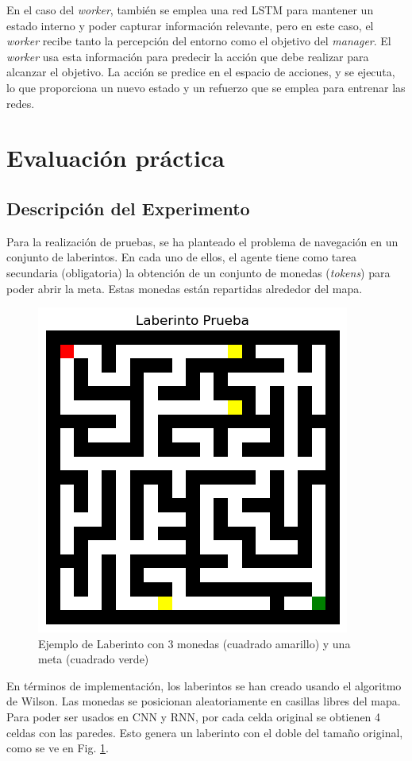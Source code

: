 \documentclass[letterpaper]{article} %
\begin{document}
En el caso del \textit{worker}, también se emplea una red LSTM para mantener un estado interno y poder capturar información relevante,
pero en este caso, el \textit{worker} recibe tanto la percepción del entorno como el objetivo del \textit{manager}. El \textit{worker} usa esta información
para predecir la acción que debe realizar para alcanzar el objetivo. La acción se predice en el espacio de acciones, y se ejecuta,
lo que proporciona un nuevo estado y un refuerzo que se emplea para entrenar las redes.

\section{Evaluación práctica}
\subsection{Descripción del Experimento}

Para la realización de pruebas, se ha planteado el problema de navegación en un conjunto de laberintos. 
En cada uno de ellos, el agente tiene como tarea secundaria (obligatoria) la obtención de un conjunto de 
monedas (\textit{tokens}) para poder abrir la meta. Estas monedas están repartidas alrededor del mapa.

\begin{figure}[H]
    \centering
    \includegraphics[width=0.7\columnwidth]{maze.png}
    \caption{Ejemplo de Laberinto con 3 monedas (cuadrado amarillo) y una meta (cuadrado verde)\label{fig:maze-example}}
\end{figure}

En términos de implementación, los laberintos se han creado usando el algoritmo de Wilson. Las monedas se posicionan
aleatoriamente en casillas libres del mapa. Para poder ser usados en CNN y RNN, por cada celda original se obtienen 4 celdas con las paredes.
Esto genera un laberinto con el doble del tamaño original, como se ve en Fig. \ref{fig:maze-example}.
\end{document}
